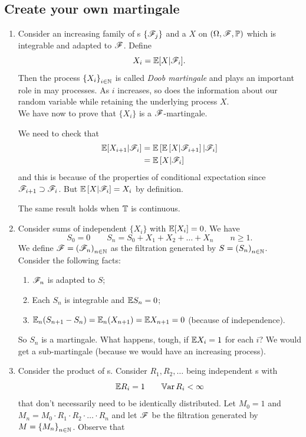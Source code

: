 \documentclass{report}
\begin{document}
\subsection{Create your own martingale}
\begin{enumerate}
	\item Consider an increasing family of \sa s $\{\mathscr{F}_j\}$ and a \rv{} $X$ on $(\Omega,\mathscr{F},\mathbb{P})$ which is integrable and adapted to $\mathscr{F}$.
	Define 
	\[X_i=\mathbb{E}[X|\mathscr{F}_i].\]
	Then the process ${\{X_i\}}_{i\in\mathbb{N}}$ is called \emph{Doob martingale} and plays an important role in may processes. As $i$ increases, so does the information about our random variable while retaining the underlying process $X$.\\
	We have now to prove that $\{X_i\}$ is a $\mathscr{F}$-martingale. 
	\begin{fancyproof}
		We need to check that \begin{align*}
			\mathbb{E}[X_{i+1}|\mathscr{F}_{i}]&=\mathbb{E}\left[\mathbb{E}\left[X|\mathscr{F}_{i+1}\right]|\mathscr{F}_{i}\right]\\
			&=\mathbb{E}\left[X|\mathscr{F}_{i}\right]
		\end{align*}
		and this is because of the properties of conditional expectation since $\mathscr{F}_{i+1}\supset\mathscr{F}_{i}$. But $\mathbb{E}\left[X|\mathscr{F}_{i}\right]=X_i$ by definition.
	\end{fancyproof}
	The same result holds when $\mathbb{T}$ is continuous.
	\item Consider sums of independent \rv $\{X_i\}$ with $\mathbb{E}[X_i]=0$. We have 
	\[S_0=0\qquad S_n=S_0+X_1+X_2+\ldots+X_{n}\qquad n\geq1.\]
	We define $\mathscr{F}={(\mathscr{F}_{n})}_{n\in\mathbb{N}}$ as the filtration generated by $S={(S_{n})}_{n\in\mathbb{N}}$. Consider the following facts:
	\begin{enumerate}
		\item $\mathscr{F}_{n}$ is adapted to $S$;
		\item Each $S_{n}$ is integrable and $\mathbb{E} S_{n}=0$;
		\item $\mathbb{E}_{n}(S_{n+1}-S_n)=\mathbb{E}_n(X_{n+1})=\mathbb{E} X_{n+1}=0$ (because of independence).
	\end{enumerate}
	So $S_{n}$ is a martingale.
	What happens, tough, if $\mathbb{E} X_i=1$ for each $i$? We would get a sub-martingale (because we would have an increasing process).
	\item Consider the product of \rv s. Consider $R_1,R_2,\ldots$ being independent \rv s with
	\[\mathbb{E} R_i=1\qquad\mathbb{V}\mathrm{ar}\, R_i<\infty\]
	that don't necessarily need to be identically distributed. Let $M_{0}=1$ and $M_n=M_{0}\cdot R_{1}\cdot R_{2}\cdot\ldots\cdot R_{n}$ and let $\mathscr{F}$ be the filtration generated by $M={\{M_n\}}_{n\in\mathbb{N}}$. Observe that

\end{enumerate}
\end{document}
